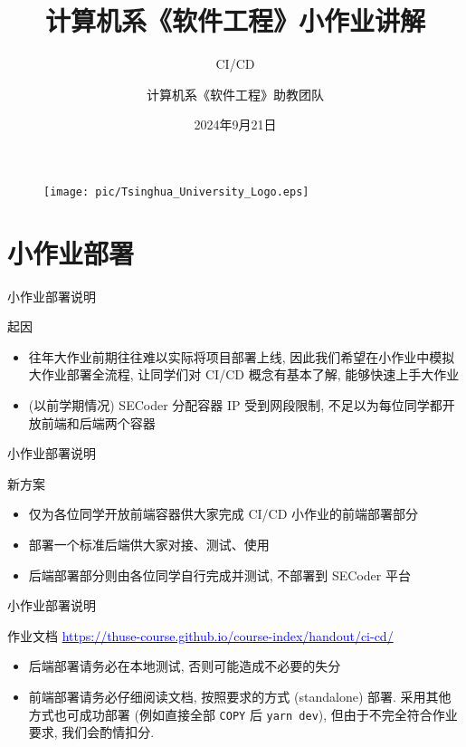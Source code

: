 \documentclass{beamer}
\author{计算机系《软件工程》助教团队}
\title{计算机系《软件工程》小作业讲解}
\subtitle{CI/CD}
\institute{清华大学计算机科学与技术系}
\date{2024年9月21日}
\begin{document}
\begin{frame}
    \titlepage
    \begin{figure}[htpb]
        \begin{center}
            \texttt{[image: pic/Tsinghua\_University\_Logo.eps]}
        \end{center}
    \end{figure}
\end{frame}

\begin{frame}
    \tableofcontents[sectionstyle=show,subsectionstyle=show/shaded/hide,subsubsectionstyle=show/shaded/hide]
\end{frame}

\section{小作业部署}

\begin{frame}{小作业部署说明}
    \begin{block}{起因}
        \begin{itemize}
            \item 往年大作业前期往往难以实际将项目部署上线, 因此我们希望在小作业中模拟大作业部署全流程, 让同学们对 CI/CD 概念有基本了解, 能够快速上手大作业
            \item (以前学期情况) SECoder 分配容器 IP 受到网段限制, 不足以为每位同学都开放前端和后端两个容器
        \end{itemize}
    \end{block}
\end{frame}

\begin{frame}{小作业部署说明}
    \begin{block}{新方案}
        \begin{itemize}
            \item 仅为各位同学开放前端容器供大家完成 CI/CD 小作业的前端部署部分
            \item 部署一个标准后端供大家对接、测试、使用
            \item 后端部署部分则由各位同学自行完成并测试, 不部署到 SECoder 平台
        \end{itemize}
    \end{block}
\end{frame}

\begin{frame}{小作业部署说明}
    \begin{block}{作业文档}
        \href{https://thuse-course.github.io/course-index/handout/ci-cd/}{\textcolor{blue}{https://thuse-course.github.io/course-index/handout/ci-cd/}}
        \begin{itemize}
            \item 后端部署请务必在本地测试, 否则可能造成不必要的失分
            \item 前端部署请务必仔细阅读文档, 按照要求的方式 (standalone) 部署. 采用其他方式也可成功部署 (例如直接全部 \texttt{COPY} 后 \texttt{yarn dev}), 但由于不完全符合作业要求, 我们会酌情扣分. 
        \end{itemize}
    \end{block}
\end{frame}
\end{document}
